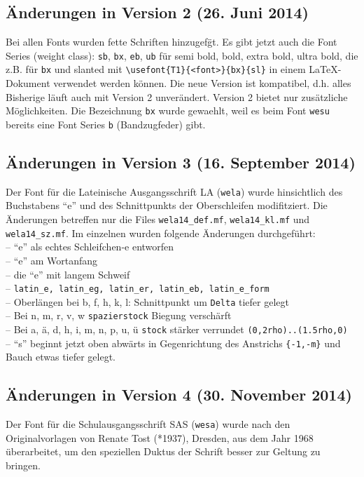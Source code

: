 \documentclass[12pt,titlepage]{article}
\begin{document}
\subsection{\"Anderungen in Version 2 (26. Juni 2014)}
Bei allen Fonts wurden fette Schriften hinzugef\"gt. 
Es gibt jetzt auch die Font Series (weight class): \verb+sb+, 
\verb+bx+, \verb+eb+, \verb+ub+
f\"ur semi bold, bold, extra bold, ultra bold, die z.B. f\"ur \verb+bx+
 und slanted mit
\verb+\usefont{T1}{<font>}{bx}{sl}+
 in einem LaTeX-Dokument verwendet werden k\"onnen.
Die neue Version ist kompatibel, d.h. alles Bisherige l\"auft auch mit 
Version 2 unver\"andert. Version 2 bietet nur zus\"atzliche M\"oglichkeiten.
Die Bezeichnung \verb+bx+ wurde gewaehlt, weil es beim Font \verb+wesu+ 
bereits eine Font Series \verb+b+ (Bandzugfeder) gibt.

\subsection{\"Anderungen in Version 3 (16. September 2014)}
Der Font f\"ur die Lateinische Ausgangsschrift LA (\verb+wela+)
wurde hinsichtlich des Buchstabens ``e'' und des Schnittpunkts der 
Oberschleifen modifitziert. Die \"Anderungen betreffen nur die Files
\verb+wela14_def.mf+,  \verb+wela14_kl.mf+ und \verb+wela14_sz.mf+. Im
einzelnen wurden folgende \"Anderungen durchgef\"uhrt:\\
 -- ``e'' als echtes Schleifchen-e entworfen\\
 --            ``e'' am Wortanfang\\
-- die ``e'' mit langem Schweif\\
 --            \verb+latin_e, latin_eg, latin_er, latin_eb, latin_e_form+\\
--             Oberl\"angen bei b, f, h, k, l: 
Schnittpunkt um \verb+Delta+ tiefer gelegt\\
--             Bei n, m, r, v, w \verb+spazierstock+ Biegung versch\"arft\\
--           Bei  a, \"a, d, h, i, m, n, p, u, \"u \verb+stock+ st\"arker 
verrundet \verb+(0,2rho)..(1.5rho,0)+\\
 --            ``s'' beginnt jetzt oben abw\"arts in Gegenrichtung des 
Anstrichs \verb+{-1,-m}+
                 und Bauch etwas tiefer gelegt.

\subsection{\"Anderungen in Version 4 (30. November 2014)}
Der Font f\"ur die Schulausgangsschrift SAS (\verb+wesa+) wurde 
nach den Originalvorlagen von Renate Tost (*1937), Dresden,  aus dem Jahr 1968
\"uberarbeitet, um den speziellen Duktus der Schrift besser zur
Geltung zu bringen.
\end{document}

